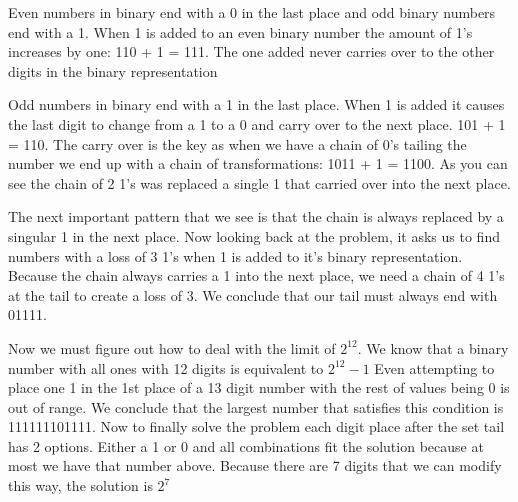 \documentclass{article}
\begin{document}
Even numbers in binary end with a 0 in the last place and odd binary numbers end with a 1. When 1 is added to an even binary number the amount of 1's increases by one: 110 + 1 = 111. The one added never carries over to the other digits in the binary representation

Odd numbers in binary end with a 1 in the last place. When 1 is added it causes the last digit to change from a 1 to a 0 and carry over to the next place. 101 + 1 = 110. The carry over is the key as when we have a chain of 0's tailing the number we end up with a chain of transformations: 1011 + 1 = 1100. As you can see the chain of 2 1's was replaced a single 1 that carried over into the next place. 

The next important pattern that we see is that the chain is always replaced by a singular 1 in the next place. Now looking back at the problem, it asks us to find numbers with a loss of 3 1's when 1 is added to it's binary representation. Because the chain always carries a 1 into the next place, we need a chain of 4 1's at the tail to create a loss of 3. We conclude that our tail must always end with 01111.

Now we must figure out how to deal with the limit of $2^{12}$. We know that a binary number with all ones with 12 digits is equivalent to $2^{12} - 1$ Even attempting to place one 1 in the 1st place of a 13 digit number with the rest of values being 0 is out of range. We conclude that the largest number that satisfies this condition is 111111101111. Now to finally solve the problem each digit place after the set tail has 2 options. Either a 1 or 0 and all combinations fit the solution because at most we have that number above. Because there are 7 digits that we can modify this way, the solution is $2^7$ 
\end{document}
